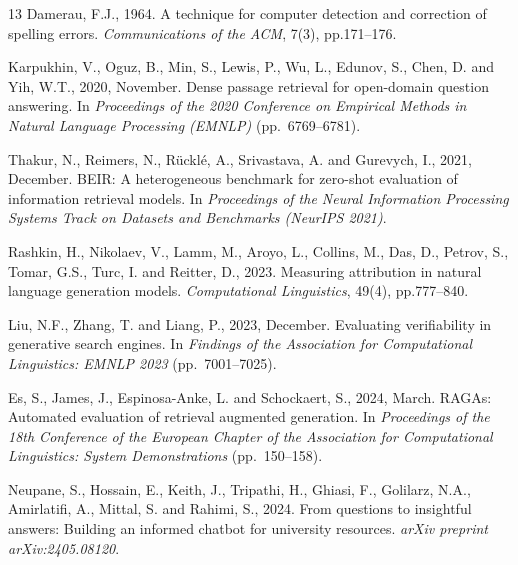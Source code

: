 \documentclass[conference]{IEEEtran}
\begin{document}
\begin{thebibliography}{13}
Damerau, F.J., 1964. A technique for computer detection and correction of spelling errors. \textit{Communications of the ACM}, 7(3), pp.171--176.

Karpukhin, V., Oguz, B., Min, S., Lewis, P., Wu, L., Edunov, S., Chen, D. and Yih, W.T., 2020, November. Dense passage retrieval for open-domain question answering. In \textit{Proceedings of the 2020 Conference on Empirical Methods in Natural Language Processing (EMNLP)} (pp.~6769--6781).

Thakur, N., Reimers, N., R\"uckl\'e, A., Srivastava, A. and Gurevych, I., 2021, December. BEIR: A heterogeneous benchmark for zero-shot evaluation of information retrieval models. In \textit{Proceedings of the Neural Information Processing Systems Track on Datasets and Benchmarks (NeurIPS 2021)}.

Rashkin, H., Nikolaev, V., Lamm, M., Aroyo, L., Collins, M., Das, D., Petrov, S., Tomar, G.S., Turc, I. and Reitter, D., 2023. Measuring attribution in natural language generation models. \textit{Computational Linguistics}, 49(4), pp.777--840.

Liu, N.F., Zhang, T. and Liang, P., 2023, December. Evaluating verifiability in generative search engines. In \textit{Findings of the Association for Computational Linguistics: EMNLP 2023} (pp.~7001--7025).

Es, S., James, J., Espinosa-Anke, L. and Schockaert, S., 2024, March. RAGAs: Automated evaluation of retrieval augmented generation. In \textit{Proceedings of the 18th Conference of the European Chapter of the Association for Computational Linguistics: System Demonstrations} (pp.~150--158).

Neupane, S., Hossain, E., Keith, J., Tripathi, H., Ghiasi, F., Golilarz, N.A., Amirlatifi, A., Mittal, S. and Rahimi, S., 2024. From questions to insightful answers: Building an informed chatbot for university resources. \textit{arXiv preprint arXiv:2405.08120}.

\end{thebibliography}
\end{document}
